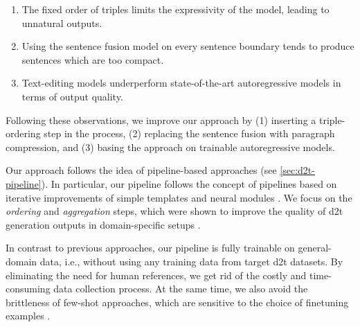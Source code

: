 \begin{enumerate}
    \item The fixed order of triples limits the expressivity of the model, leading to unnatural outputs.
    \item Using the sentence fusion model on every sentence boundary tends to produce sentences which are too compact.
    \item Text-editing models underperform state-of-the-art autoregressive models in terms of output quality.
\end{enumerate}

Following these observations, we improve our approach by (1) inserting a triple-ordering step in the process, (2) replacing the sentence fusion with paragraph compression, and (3) basing the approach on trainable autoregressive models.


Our approach follows the idea of pipeline-based approaches (see \autoref{sec:d2t-pipeline}). In particular, our pipeline follows the concept of pipelines based on iterative improvements of simple templates  \cite{laha2020scalable} and neural modules \cite{ferreiraNeuralDatatotextGeneration2019}. We focus on the \emph{ordering} and \emph{aggregation} steps, which were shown to improve the quality of \ac{d2t} generation outputs in domain-specific setups \cite{moryossef2019improving,moryossef2019step,trisedyaSentenceGenerationEntity2020,su2021plan}.

In contrast to previous approaches, our pipeline is fully trainable on general-domain data, i.e., without using any training data from target \ac{d2t} datasets. By eliminating the need for human references, we get rid of the costly and time-consuming data collection process. At the same time, we also avoid the brittleness of few-shot approaches, which are sensitive to the choice of finetuning examples \cite{chenFewShotNLGPreTrained2019,suFewShotTabletoTextGeneration2021,changSelectGenChallengeFinding2021}.

